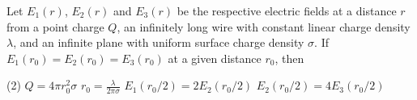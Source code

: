 
\item Let \( E_1(r) \), \( E_2(r) \) and \( E_3(r) \) be the respective electric fields at a distance \( r \) from a point charge \( Q \), an infinitely long wire with constant linear charge density \( \lambda \), and an infinite plane with uniform surface charge density \( \sigma \). If \( E_1 (r_0) = E_2 (r_0) = E_3 (r_0) \) at a given distance \( r_0 \), then
    \begin{tasks}(2)
        \task \( Q = 4\pi r_0^2 \sigma \)
        \task \( r_0 = \frac{\lambda}{2\pi\sigma} \)
        \task \( E_1 (r_0/2) = 2E_2 (r_0/2) \)
        \task \( E_2 (r_0/2) = 4E_3 (r_0/2) \)
    \end{tasks}
